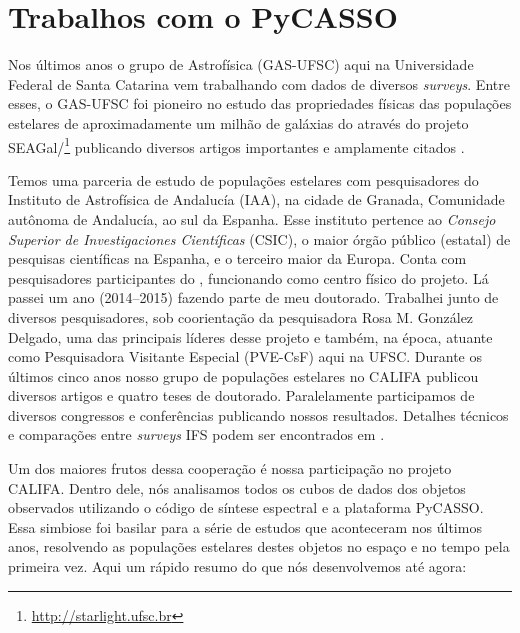 \section{Trabalhos com o PyCASSO}
\label{sec:sample:SLCAL}

Nos últimos anos o grupo de Astrofísica (GAS-UFSC) aqui na Universidade Federal de Santa Catarina vem trabalhando com dados de diversos {\em surveys}. Entre esses, o GAS-UFSC foi pioneiro no estudo das propriedades físicas das populações estelares de aproximadamente um milhão de galáxias do \SDSS através do projeto SEAGal/\starlight\footnote{\href{http://starlight.ufsc.br}{http://starlight.ufsc.br}} publicando diversos artigos importantes e amplamente citados \citep[e.g., ][]{CidFernandes.etal.2005a, Mateus.etal.2006a, Stasinska.etal.2006a, Asari.etal.2007a, Stasinska.etal.2008a, CidFernandes.etal.2011a}.

Temos uma parceria de estudo de populações estelares com pesquisadores do Instituto de Astrofísica de Andalucía (IAA), na cidade de Granada, Comunidade autônoma de Andalucía, ao sul da Espanha. Esse instituto pertence ao {\em Consejo Superior de Investigaciones Científicas} (CSIC), o maior órgão público (estatal) de pesquisas científicas na Espanha, e o terceiro maior da Europa. Conta com pesquisadores participantes do \CALS, funcionando como centro físico do projeto. Lá passei um ano (2014--2015) fazendo parte de meu doutorado. Trabalhei junto de diversos pesquisadores, sob coorientação da pesquisadora Rosa M. González Delgado, uma das principais líderes desse projeto e também, na época, atuante como Pesquisadora Visitante Especial (PVE-CsF) aqui na UFSC. Durante os últimos cinco anos nosso grupo de populações estelares no CALIFA publicou diversos artigos e quatro teses de doutorado. Paralelamente participamos de diversos congressos e conferências publicando nossos resultados. Detalhes técnicos e comparações entre {\em surveys} IFS podem ser encontrados em \citet{Andre2015}.

Um dos maiores frutos dessa cooperação é nossa participação no projeto CALIFA. Dentro dele, nós analisamos todos os cubos de dados dos objetos observados utilizando o código de síntese espectral \starlight e a plataforma PyCASSO. Essa simbiose foi basilar para a série de estudos que aconteceram nos últimos anos, resolvendo as populações estelares destes objetos no espaço e no tempo pela primeira vez. Aqui um rápido resumo do que nós desenvolvemos até agora:

